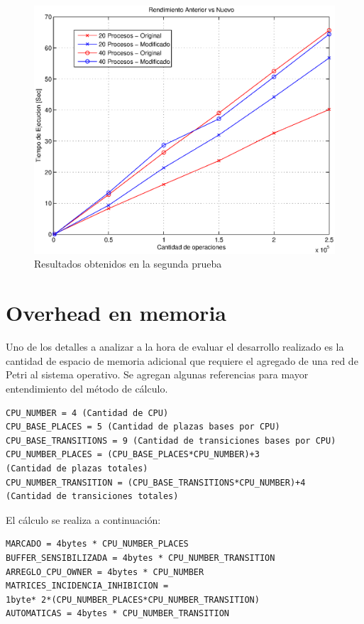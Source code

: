 \documentclass[a4paper]{book}
\begin{document}
\begin{figure}
\begin{center}
	\includegraphics[scale=0.7]{./imagenes/prueba2.eps}
	\caption{Resultados obtenidos en la segunda prueba}
	\label{Fig:figura2}
\end{center}
\end{figure}

\section{Overhead en memoria}

Uno de los detalles a analizar a la hora de evaluar el desarrollo realizado es la cantidad de espacio de memoria adicional que requiere el agregado de una red de Petri al sistema operativo.
Se agregan algunas referencias para mayor entendimiento del m\'etodo de c\'alculo.

\begin{verbatim}
CPU_NUMBER = 4 (Cantidad de CPU)
CPU_BASE_PLACES = 5 (Cantidad de plazas bases por CPU)
CPU_BASE_TRANSITIONS = 9 (Cantidad de transiciones bases por CPU)
CPU_NUMBER_PLACES = (CPU_BASE_PLACES*CPU_NUMBER)+3
(Cantidad de plazas totales)
CPU_NUMBER_TRANSITION = (CPU_BASE_TRANSITIONS*CPU_NUMBER)+4
(Cantidad de transiciones totales)
\end{verbatim}

El c\'alculo se realiza a continuaci\'on:
\begin{verbatim}
MARCADO = 4bytes * CPU_NUMBER_PLACES
BUFFER_SENSIBILIZADA = 4bytes * CPU_NUMBER_TRANSITION
ARREGLO_CPU_OWNER = 4bytes * CPU_NUMBER
MATRICES_INCIDENCIA_INHIBICION =
1byte* 2*(CPU_NUMBER_PLACES*CPU_NUMBER_TRANSITION)
AUTOMATICAS = 4bytes * CPU_NUMBER_TRANSITION
\end{verbatim}
\end{document}
